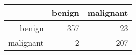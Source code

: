 \begin{tabular}{rrr}
  \hline
 & benign & malignant \\ 
  \hline
benign & 357 &  23 \\ 
  malignant &   2 & 207 \\ 
   \hline
\end{tabular}

